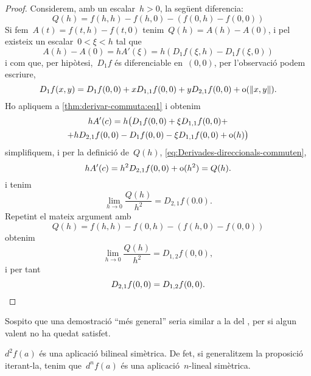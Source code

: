 \documentclass[../calcul-en-diverses-variables.tex]{subfiles}
\begin{document}
\begin{theorem}
\begin{proof}
        Considerem, amb un escalar~\(h>0\), la següent diferencia:
        \begin{equation}\label{eq:Derivades-direccionals-commuten}
        Q(h)=f(h,h)-f(h,0)-(f(0,h)-f(0,0))
        \end{equation}
        Si fem~\(A(t)=f(t,h)-f(t,0)\) tenim~\(Q(h)=A(h)-A(0)\), i pel  existeix un escalar~\(0<\xi<h\) tal que
        \begin{equation}\label{thm:derivar-commuta:eq1}
        A(h)-A(0)=hA'(\xi)=h(D_{1}f(\xi,h)-D_{1}f(\xi,0))
        \end{equation}
        i com que, per hipòtesi,~\(D_{1}f\) és diferenciable en~\((0,0)\), per l'observació  podem escriure,
        \[
            D_{1}f(x,y)=D_{1}f(0,0)+xD_{1,1}f(0,0)+yD_{2,1}f(0,0)+\omicron(\norm{x,y}).
        \]
        Ho apliquem a \eqref{thm:derivar-commuta:eq1} i obtenim
        \begin{multline*}
        hA'(c)=h\big(D_{1}f(0,0)+\xi D_{1,1}f(0,0)+\\+hD_{2,1}f(0,0)-D_{1}f(0,0)-\xi D_{1,1}f(0,0)+\operatorname{o}(h)\big)
        \end{multline*}
        simplifiquem, i per la definició de~\(Q(h)\), \eqref{eq:Derivades-direccionals-commuten},
        \[
            hA'(c)=h^{2}D_{2,1}f(0,0)+\operatorname{o}(h^{2})=Q(h).
        \]
        i tenim
        \[
            \lim_{h\to0}\frac{Q(h)}{h^{2}}=D_{2,1}f(0.0).
        \]
        Repetint el mateix argument amb
        \[
            Q(h)=f(h,h)-f(0,h)-(f(h,0)-f(0,0))
        \]
        obtenim
        \[
            \lim_{h\to0}\frac{Q(h)}{h^{2}}=D_{1,2}f(0,0),
        \]
        i per tant
        \[
            D_{2,1}f(0,0)=D_{1,2}f(0,0).\qedhere
        \]
    \end{proof}
    \begin{note}
        Sospito que una demostració ``més general'' seria similar a la del , per si algun valent no ha quedat satisfet.
    \end{note}
    \end{theorem}
    \begin{corollary}\label{obs:diferencial-bilineal}
        \(d^{2}f(a)\) és una aplicació bilineal simètrica.
        De fet, si generalitzem la proposició iterant-la, tenim que~\(d^{n}f(a)\) és una aplicació~\(n\)-lineal simètrica.
    \end{corollary}
\end{document}

